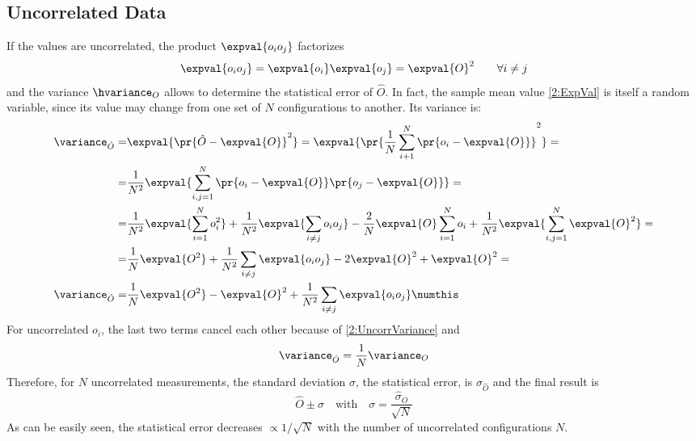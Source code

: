 \subsection{Uncorrelated Data}
If the values are uncorrelated, the product $\expval{o_io_j}$ factorizes
\begin{equation}
    \expval{o_io_j} = \expval{o_i}\expval{o_j} = \expval{O}^2 \qquad \forall i\neq j \label{2:UncorrVariance}
\end{equation}
and the variance $\hvariance_O$ allows to determine the statistical error of $\hat{O}$.
In fact, the sample mean value \eqref{2:ExpVal} is itself a random variable, since its value may change from one set of $N$ configurations to another.
Its variance is:
\begin{align*}
    \variance_{\hat{O}} =& \expval{\pr{\hat{O}-\expval{O}}^2} = \expval{\pr{\frac1N\sum_{i+1}^N\pr{o_i-\expval{O}}}^2} = \\
    =& \frac1{N^2}\expval{\sum_{i,j=1}^N\pr{o_i-\expval{O}}\pr{o_j-\expval{O}}} = \\
    =& \frac1{N^2}\expval{\sum_{i=1}^No_i^2} + \frac1{N^2}\expval{\sum_{i\neq j}o_io_j} -\frac2N\expval{O}\sum_{i=1}^No_i +\frac1{N^2}\expval{\sum_{i,j=1}^N\expval{O}^2} =\\
    =& \frac1N\expval{O^2} +\frac1{N^2}\sum_{i\neq j}\expval{o_io_j} -2\expval{O}^2 +\expval{O}^2 = \\
    \variance_{\hat{O}} =& \frac1N\expval{O^2} -\expval{O}^2 +\frac1{N^2}\sum_{i\neq j}\expval{o_io_j} \numthis\label{2:CorrVarMean}
\end{align*}
For uncorrelated $o_i$, the last two terms cancel each other because of \eqref{2:UncorrVariance} and
\begin{equation}
    \variance_{\hat{O}} = \frac1N\variance_O \label{2:VarianceRelation}
\end{equation}
Therefore, for $N$ uncorrelated measurements, the standard deviation $\sigma$, \ie the statistical error, is $\sigma_{\hat{O}}$ and the final result is
\begin{equation}
    \hat{O}\pm\sigma \quad \text{with} \quad \sigma=\frac{\hat{\sigma}_O}{\sqrt{N}} \label{2:FinalMeasureUncorr}
\end{equation}
As can be easily seen, the statistical error decreases $\varpropto1/\sqrt{N}$ with the number of uncorrelated configurations $N$.

